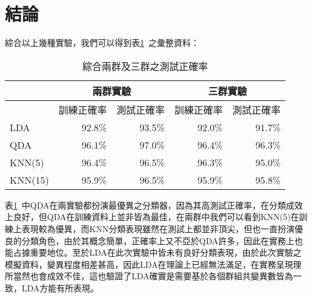 	\section{結論}
		綜合以上幾種實驗，我們可以得到表\ref{table:result}\ 之彙整資料：
		\bigskip			
			\begin{table}[H]				
				\caption{綜合兩群及三群之測試正確率}\label{table:result}
				\centering
				\extrarowheight=8pt
				\begin{tabular}{lrrrr} 					
				\hline
				&\multicolumn{2}{c}{兩群實驗}	 &\multicolumn{2}{c}{三群實驗}\\ 									\hline
				    &訓練正確率 &測試正確率 &訓練正確率 &測試正確率 \\ \hline 
	LDA & 92.8\%  &93.5\%    &92.0\%  &91.7\%   \\ 	
	QDA & 96.1\%  & 97.0\%  &96.4\% &96.3\% \\ 
	KNN(5) & 96.4\%  &96.5\% &96.3\%   &95.0\%   \\ 
	KNN(15) & 95.9\%  &96.5\%  &95.9\% &95.8\% \\ 
				\hline					
				\end{tabular}
			\end{table}
			\bigskip
		表\ref{table:result}\ 中QDA在兩實驗都扮演最優異之分類器，因為其高測試正確率，在分類成效上良好，但QDA在訓練資料上並非皆為最佳，在兩群中我們可以看到KNN(5)在訓練上表現較為優異，而KNN分類表現雖然在測試上都並非頂尖，但也一直扮演優良的分類角色，由於其概念簡單，正確率上又不亞於QDA許多，因此在實務上也能占據重要地位。至於LDA在此次實驗中皆未有良好分類表現，由於此次實驗之模擬資料，變異程度相差甚高，因此LDA在理論上已經無法滿足，在實務呈現理所當然也會成效不佳，這也驗證了LDA確實是需要基於各個群組共變異數皆為一致，LDA方能有所表現。\\
	
%